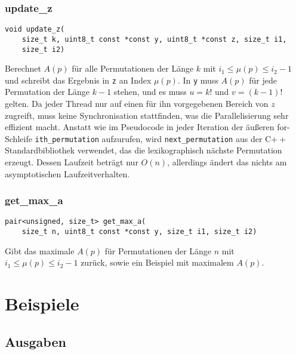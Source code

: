 \documentclass[a4paper, 10pt, ngerman]{article}
\begin{document}
\subsubsection{update\_z}
\verb|void update_z(| \\
\verb|    size_t k, uint8_t const *const y, uint8_t *const z, size_t i1,| \\
\verb|    size_t i2)| \\
\medskip

\noindent Berechnet $A(p)$ für alle Permutationen der Länge $k$ mit $i_1 \le \mu(p) \le i_2 - 1$ und schreibt das Ergebnis in \verb|z| an Index $\mu(p)$. In \verb|y| muss $A(p)$ für jede Permutation der Länge $k-1$ stehen, und es muss $u = k!$ und $v = (k - 1)!$ gelten. Da jeder Thread nur auf einen für ihn vorgegebenen Bereich von $z$ zugreift, muss keine Synchronisation stattfinden, was die Parallelisierung sehr effizient macht. Anstatt wie im Pseudocode in jeder Iteration der äußeren for-Schleife \verb|ith_permutation| aufzurufen, wird \verb|next_permutation| aus der C$++$ Standardbibliothek verwendet, das die lexikographisch nächste Permutation erzeugt. Dessen Laufzeit beträgt nur $O(n)$, allerdings ändert das nichts am asymptotischen Laufzeitverhalten.

\subsubsection{get\_max\_a}
\verb|pair<unsigned, size_t> get_max_a(| \\
\verb|    size_t n, uint8_t const *const y, size_t i1, size_t i2)| \\
\medskip

\noindent Gibt das maximale $A(p)$ für Permutationen der Länge $n$ mit $i_1 \le \mu(p) \le i_2 - 1$ zurück, sowie ein Beispiel mit maximalem $A(p)$.

\section{Beispiele}

\subsection{Ausgaben}
\end{document}
